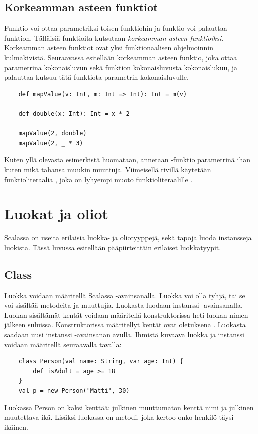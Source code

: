 \subsection{Korkeamman asteen funktiot}
Funktio voi ottaa parametriksi toisen funktiohin ja funktio voi palauttaa funktion. Tälläisiä funktioita kutsutaan \textit{korkeamman asteen funktioiksi}. Korkeamman asteen funktiot ovat yksi funktionaalisen ohjelmoinnin kulmakivistä. Seuraavassa esitellään korkeamman asteen funktio, joka ottaa parametrina kokonaisluvun sekä funktion kokonaisluvusta kokonaislukuu, ja palauttaa kutsuu tätä funktiota parametrin kokonaisluvulle.
\begin{lstlisting}
    def mapValue(v: Int, m: Int => Int): Int = m(v)
    
    def double(x: Int): Int = x * 2
    
    mapValue(2, double)
    mapValue(2, _ * 3)
\end{lstlisting}
Kuten yllä olevasta esimerkistä huomataan, annetaan -funktio parametrinä ihan kuten mikä tahansa muukin muuttuja. Viimeisellä rivillä käytetään funktioliteraalia , joka on lyhyempi muoto funktioliteraalille .
\cite[Luku 12]{scalaForTheImpatient}


\section{Luokat ja oliot} \label{LuokatJaOliot}
Scalassa on useita erilaisia luokka- ja oliotyyppejä, sekä tapoja luoda instansseja luokista. Tässä luvussa esitellään pääpiirteittäin erilaiset luokkatyypit.

\subsection{Class} \label{class}
Luokka voidaan määritellä Scalassa -avainsanalla. Luokka voi olla tyhjä, tai se voi sisältää metodeita ja muuttujia. Luokasta luodaan instanssi -avainsanalla. Luokan sisältämät kentät voidaan määritellä konstruktorissa heti luokan nimen jälkeen suluissa. Konstruktorissa määritellyt kentät ovat oletuksena . Luokasta saadaan uusi instanssi -avainsanan avulla. Ihmistä kuvaava luokka ja instanssi voidaan määritellä seuraavalla tavalla:
\begin{lstlisting}
    class Person(val name: String, var age: Int) {
        def isAdult = age >= 18
    }
    val p = new Person("Matti", 30)
\end{lstlisting}
Luokassa Person on kaksi kenttää: julkinen muuttumaton kenttä nimi ja julkinen muutettava ikä. Lisäksi luokassa on metodi, joka kertoo onko henkilö täysi-ikäinen.
\cite[Classes]{tourOfScala}


